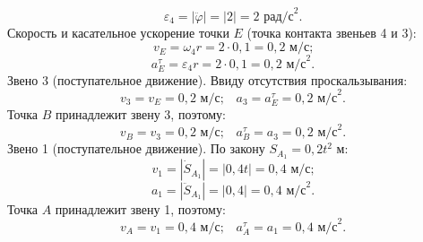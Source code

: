 \documentclass{article}
\begin{document}
\begin{equation}
\varepsilon_4 = |\ddot{\varphi}| = |2| = 2 \text{ рад/с}^2.
\end{equation}
\medskip
Скорость и касательное ускорение точки $E$ (точка контакта звеньев 4 и 3):
\begin{equation}
v_E = \omega_4 r = 2 \cdot 0,1 = 0,2 \text{ м/с;}
\end{equation}
\begin{equation}
a_E^\tau = \varepsilon_4 r = 2 \cdot 0,1 = 0,2 \text{ м/с}^2.
\end{equation}
\medskip
Звено 3 (поступательное движение). Ввиду отсутствия проскальзывания:
\begin{equation}
v_3 = v_E = 0,2 \text{ м/с;} \quad a_3 = a_E^\tau = 0,2 \text{ м/с}^2.
\end{equation}
\medskip
Точка $B$ принадлежит звену 3, поэтому:
\begin{equation}
v_B = v_3 = 0,2 \text{ м/с;} \quad a_B^\tau = a_3 = 0,2 \text{ м/с}^2.
\end{equation}
\medskip
Звено 1 (поступательное движение). По закону $S_{A_1} = 0,2t^2$ м:
\begin{equation}
v_1 = |\dot{S}_{A_1}| = |0,4t| = 0,4 \text{ м/с;}
\end{equation}
\begin{equation}
a_1 = |\ddot{S}_{A_1}| = |0,4| = 0,4 \text{ м/с}^2.
\end{equation}
\medskip
Точка $A$ принадлежит звену 1, поэтому:
\begin{equation}
v_A = v_1 = 0,4 \text{ м/с;} \quad a_A^\tau = a_1 = 0,4 \text{ м/с}^2.
\end{equation}

\medskip
\end{document}
